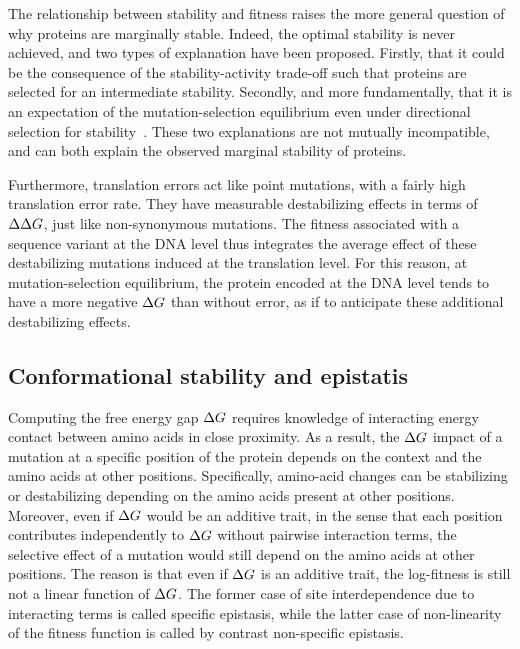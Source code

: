 The relationship between stability and fitness raises the more general question of why proteins are marginally stable.
Indeed, the optimal stability is never achieved, and two types of explanation have been proposed.
Firstly, that it could be the consequence of the stability-activity trade-off such that proteins are selected for an intermediate stability.
Secondly, and more fundamentally, that it is an expectation of the mutation-selection equilibrium even under directional selection for stability~\citep{Taverna2002}.
These two explanations are not mutually incompatible, and can both explain the observed marginal stability of proteins.

Furthermore, translation errors act like point mutations, with a fairly high translation error rate.
They have measurable destabilizing effects in terms of $\Delta \Delta G$, just like non-synonymous mutations.
The fitness associated with a sequence variant at the \acrshort{DNA} level thus integrates the average effect of these destabilizing mutations induced at the translation level.
For this reason, at mutation-selection equilibrium, the protein encoded at the \acrshort{DNA} level tends to have a more negative $\Delta G$ than without error, as if to anticipate these additional destabilizing effects.

\subsection{Conformational stability and epistatis}
\label{subsec:conformational-stability-and-epistatis}

Computing the free energy gap $\Delta G$ requires knowledge of interacting energy contact between amino acids in close proximity.
As a result, the $\Delta G$ impact of a mutation at a specific position of the protein depends on the context and the amino acids at other positions.
Specifically, amino-acid changes can be stabilizing or destabilizing depending on the amino acids present at other positions.
Moreover, even if $\Delta G$ would be an additive trait, in the sense that each position contributes independently to $\Delta G$ without pairwise interaction terms, the selective effect of a mutation would still depend on the amino acids at other positions.
The reason is that even if $\Delta G$ is an additive trait, the log-fitness is still not a linear function of $\Delta G$.
The former case of site interdependence due to interacting terms is called specific epistasis, while the latter case of non-linearity of the fitness function is called by contrast non-specific epistasis.


